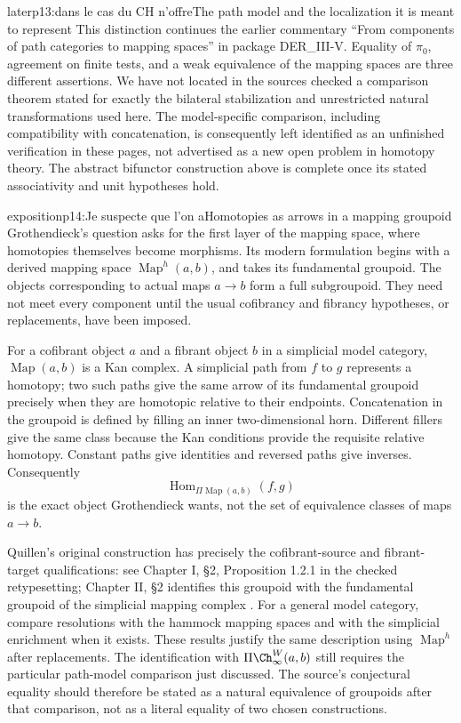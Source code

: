 \begin{dcomment}{later}{p13:dans le cas du CH n'offre}{The path model and the localization it is meant to represent}
This distinction continues the earlier commentary ``From components of path categories to mapping spaces'' in package DER\_III-V. Equality of $\pi_0$, agreement on finite tests, and a weak equivalence of the mapping spaces are three different assertions. We have not located in the sources checked a comparison theorem stated for exactly the bilateral stabilization and unrestricted natural transformations used here. The model-specific comparison, including compatibility with concatenation, is consequently left identified as an unfinished verification in these pages, not advertised as a new open problem in homotopy theory. The abstract bifunctor construction above is complete once its stated associativity and unit hypotheses hold.
\end{dcomment}

\begin{dcomment}{exposition}{p14:Je suspecte que l'on a}{Homotopies as arrows in a mapping groupoid}
Grothendieck's question asks for the first layer of the mapping space, where homotopies themselves become morphisms. Its modern formulation begins with a derived mapping space $\operatorname{Map}^{h}(a,b)$, and takes its fundamental groupoid. The objects corresponding to actual maps $a\to b$ form a full subgroupoid. They need not meet every component until the usual cofibrancy and fibrancy hypotheses, or replacements, have been imposed.

For a cofibrant object $a$ and a fibrant object $b$ in a simplicial model category, $\operatorname{Map}(a,b)$ is a Kan complex. A simplicial path from $f$ to $g$ represents a homotopy; two such paths give the same arrow of its fundamental groupoid precisely when they are homotopic relative to their endpoints. Concatenation in the groupoid is defined by filling an inner two-dimensional horn. Different fillers give the same class because the Kan conditions provide the requisite relative homotopy. Constant paths give identities and reversed paths give inverses. Consequently
\[
 \operatorname{Hom}_{\Pi\operatorname{Map}(a,b)}(f,g)
\]
is the exact object Grothendieck wants, not the set of equivalence classes of maps $a\to b$.

Quillen's original construction has precisely the cofibrant-source and fibrant-target qualifications: see Chapter I, \S2, Proposition 1.2.1 in the checked retypesetting; Chapter II, \S2 identifies this groupoid with the fundamental groupoid of the simplicial mapping complex \citep{Quillen1967}. For a general model category, \citet[Propositions 4.4--4.5 and 4.8]{DwyerKan1980Function} compare resolutions with the hammock mapping spaces and with the simplicial enrichment when it exists. These results justify the same description using $\operatorname{Map}^{h}$ after replacements. The identification with $\Pi\Ch^W_\infty(a,b)$ still requires the particular path-model comparison just discussed. The source's conjectural equality should therefore be stated as a natural equivalence of groupoids after that comparison, not as a literal equality of two chosen constructions.
\end{dcomment}

